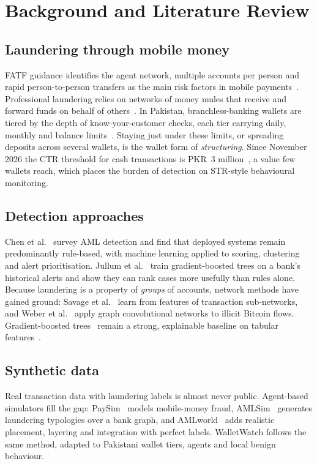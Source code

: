 \documentclass[conference,10pt]{IEEEtran}
\begin{document}
\section{Background and Literature Review}

\subsection{Laundering through mobile money}
FATF guidance identifies the agent network, multiple accounts per person and rapid
person-to-person transfers as the main risk factors in mobile payments~\cite{fatf2013npps}.
Professional laundering relies on networks of money mules that receive and forward funds on
behalf of others~\cite{fatf2018pml}. In Pakistan, branchless-banking wallets are tiered by the depth
of know-your-customer checks, each tier carrying daily, monthly and balance
limits~\cite{sbp2016bb}. Staying just under these limits, or spreading deposits across several
wallets, is the wallet form of \emph{structuring}. Since November 2026 the CTR threshold for
cash transactions is PKR~3 million~\cite{sbp2026cl24}, a value few wallets reach, which places the
burden of detection on STR-style behavioural monitoring.

\subsection{Detection approaches}
Chen et al.~\cite{chen2018amlreview} survey AML detection and find that deployed systems remain
predominantly rule-based, with machine learning applied to scoring, clustering and alert
prioritisation. Jullum et al.~\cite{jullum2020} train gradient-boosted trees on a bank's historical
alerts and show they can rank cases more usefully than rules alone. Because laundering is a property
of \emph{groups} of accounts, network methods have gained ground: Savage et al.~\cite{savage2016}
learn from features of transaction sub-networks, and Weber et al.~\cite{weber2019gcn} apply graph
convolutional networks to illicit Bitcoin flows. Gradient-boosted trees~\cite{chen2016xgboost}
remain a strong, explainable baseline on tabular features~\cite{altman2023amlworld}.

\subsection{Synthetic data}
Real transaction data with laundering labels is almost never public. Agent-based simulators fill the
gap: PaySim~\cite{lopezrojas2016paysim} models mobile-money fraud, AMLSim~\cite{amlsim} generates
laundering typologies over a bank graph, and AMLworld~\cite{altman2023amlworld} adds realistic
placement, layering and integration with perfect labels. WalletWatch follows the same method, adapted
to Pakistani wallet tiers, agents and local benign behaviour.
\end{document}
